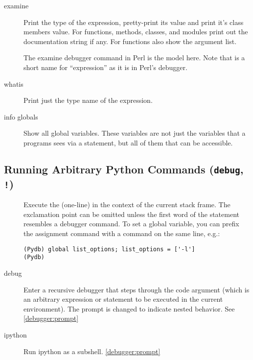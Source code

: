 \begin{description}
\item[examine ]\label{command:examine}

Print the type of the expression, pretty-print its value and print
it's class members value.  For functions, methods, classes, and
modules print out the documentation string if any.  For functions also
show the argument list.

The examine debugger command in Perl is the model here. Note that
 is a short name for ``expression'' as it is in Perl's
debugger.

\item[whatis ]\label{command:whatis}

Print just the type name of the expression.

\item[info globals]\label{command:info-globals}

Show all global variables. These variables are not just the variables
that a programs sees via a  statement, but all of them
that can be accessible.

\end{description}

\subsection{Running Arbitrary Python Commands ({\tt debug}, {\tt !})\label{subsection-commands}}

\begin{description}

\item[\optional{!}]

Execute the (one-line)  in the context of
the current stack frame.
The exclamation point can be omitted unless the first word
of the statement resembles a debugger command.
To set a global variable, you can prefix the assignment
command with a  command on the same line, e.g.:

\begin{verbatim}
(Pydb) global list_options; list_options = ['-l']
(Pydb)
\end{verbatim}

\item[debug ]

Enter a recursive debugger that steps through the code argument (which
is an arbitrary expression or statement to be executed in the current
environment). The prompt is changed to indicate nested behavior. See
\ref{debugger:prompt}

\item[ipython ]\label{command:iptyhon}

Run ipython as a subshell.
\ref{debugger:prompt}

\end{description}

